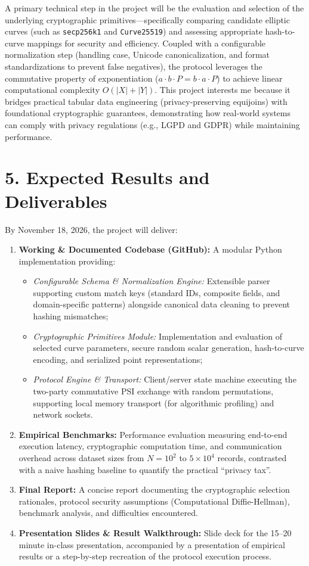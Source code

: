 \documentclass[10pt,a4paper]{article}
\begin{document}
A primary technical step in the project will be the evaluation and selection of the underlying cryptographic primitives---specifically comparing candidate elliptic curves (such as \texttt{secp256k1} and \texttt{Curve25519}) and assessing appropriate hash-to-curve mappings for security and efficiency. Coupled with a configurable normalization step (handling case, Unicode canonicalization, and format standardizations to prevent false negatives), the protocol leverages the commutative property of exponentiation ($a \cdot b \cdot P = b \cdot a \cdot P$) to achieve linear computational complexity $O(|X| + |Y|)$. This project interests me because it bridges practical tabular data engineering (privacy-preserving equijoins) with foundational cryptographic guarantees, demonstrating how real-world systems can comply with privacy regulations (e.g., LGPD and GDPR) while maintaining performance.

\section*{5. Expected Results and Deliverables}
By November 18, 2026, the project will deliver:
\begin{enumerate}[label=\textbf{\arabic*.}]
    \item \textbf{Working \& Documented Codebase (GitHub):} A modular Python implementation providing:
    \begin{itemize}[label=--]
        \item \emph{Configurable Schema \& Normalization Engine:} Extensible parser supporting custom match keys (standard IDs, composite fields, and domain-specific patterns) alongside canonical data cleaning to prevent hashing mismatches;
        \item \emph{Cryptographic Primitives Module:} Implementation and evaluation of selected curve parameters, secure random scalar generation, hash-to-curve encoding, and serialized point representations;
        \item \emph{Protocol Engine \& Transport:} Client/server state machine executing the two-party commutative PSI exchange with random permutations, supporting local memory transport (for algorithmic profiling) and network sockets.
    \end{itemize}
    \item \textbf{Empirical Benchmarks:} Performance evaluation measuring end-to-end execution latency, cryptographic computation time, and communication overhead across dataset sizes from $N = 10^2$ to $5 \times 10^4$ records, contrasted with a naive hashing baseline to quantify the practical ``privacy tax''.
    \item \textbf{Final Report:} A concise report documenting the cryptographic selection rationales, protocol security assumptions (Computational Diffie-Hellman), benchmark analysis, and difficulties encountered.
    \item \textbf{Presentation Slides \& Result Walkthrough:} Slide deck for the 15--20 minute in-class presentation, accompanied by a presentation of empirical results or a step-by-step recreation of the protocol execution process.
\end{enumerate}
\end{document}
